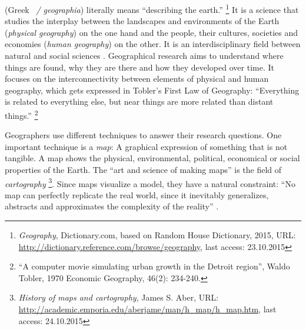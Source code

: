(Greek ~\emph{\textgamma\textepsilon\textomega\textgamma\textrho\textalpha\textphi\textiota\textalpha / geographia}) literally means ``describing the earth.''
\footnote{
  \emph{Geography},
  Dictionary.com, based on Random House Dictionary, 2015,
  URL: \url{http://dictionary.reference.com/browse/geography},
  last access: 23.10.2015
}
It is a science that studies the interplay between the landscapes and environments of the Earth (\emph{physical geography}) on the one hand and the people, their cultures, societies and economies (\emph{human geography}) on the other. It is an interdisciplinary field between natural and social sciences
\cite{rgsGeography}. Geographical research aims to understand where things are found, why they are there and how they developed over time. It focuses on the interconnectivity between elements of physical and human geography, which gets expressed in Tobler's First Law of Geography: ``Everything is related to everything else, but near things are more related than distant things.''
\footnote{
  ``A computer movie simulating urban growth in the Detroit region'',
  Waldo Tobler, 1970
  Economic Geography, 46(2): 234-240.
}

Geographers use different techniques to answer their research questions. One important technique is a \emph{map}: A graphical expression of something that is not tangible. A map shows the physical, environmental, political, economical or social properties of the Earth. The ``art and science of making maps'' is the field of \emph{cartography}
\footnote{
  \emph{History of maps and cartography},
  James S. Aber,
  URL: \url{http://academic.emporia.edu/aberjame/map/h_map/h_map.htm},
  last access: 24.10.2015
}.
Since maps visualize a model, they have a natural constraint: ``No map can perfectly replicate the real world, since it inevitably generalizes, abstracts and approximates the complexity of the reality''
\cite[p. 181]{knowles2008placing}.



\vspace{2em}


